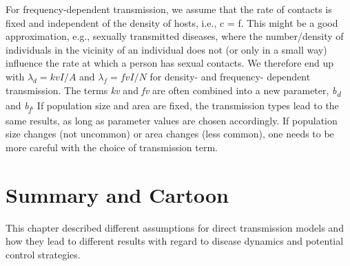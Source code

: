 \documentclass[]{book}
\theoremstyle{definition}
\theoremstyle{definition}
\theoremstyle{definition}
\theoremstyle{remark}
\begin{document}
For frequency-dependent transmission, we assume that the rate of
contacts is fixed and independent of the density of hosts, i.e., c = f.
This might be a good approximation, e.g., sexually transmitted diseases,
where the number/density of individuals in the vicinity of an individual
does not (or only in a small way) influence the rate at which a person
has sexual contacts. We therefore end up with \(\lambda_d= kv I/A\) and
\(\lambda_f= fv I/N\) for density- and frequency- dependent
transmission. The terms \emph{kv} and \emph{fv} are often combined into
a new parameter, \emph{b\textsubscript{d}} and
\emph{b\textsubscript{f}}. If population size and area are fixed, the
transmission types lead to the same results, as long as parameter values
are chosen accordingly. If population size changes (not uncommon) or
area changes (less common), one needs to be more careful with the choice
of transmission term.

\section{Summary and Cartoon}\label{summary-and-cartoon-5}

This chapter described different assumptions for direct transmission
models and how they lead to different results with regard to disease
dynamics and potential control strategies.
\end{document}
